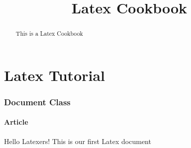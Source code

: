 \documentclass[a4paper, 12pt]{article}
\title{Latex Cookbook}
\begin{document}
\maketitle

\begin{abstract}
This is a Latex Cookbook
\end{abstract}

\part{Latex Tutorial}

\section{Document Class}

\subsection{Article}

Hello Latexers! This is our first Latex document
\end{document}
